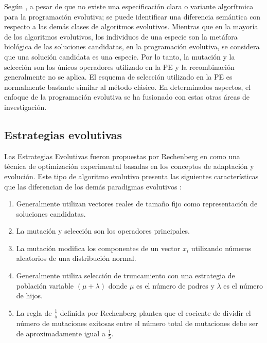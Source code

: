Según \cite{weise2009global}, a pesar de que no existe una especificación clara o variante algorítmica para la programación evolutiva; se puede identificar una diferencia semántica con respecto a las demás clases de algoritmos evolutivos. Mientras que en la mayoría de los algoritmos evolutivos, los individuos de una especie son la metáfora biológica de las soluciones candidatas, en la programación evolutiva, se considera que una solución candidata es una especie. Por lo tanto, la mutación y la selección son los únicos operadores utilizado en la PE y la recombinación generalmente no se aplica. El esquema de selección utilizado en la PE es normalmente bastante similar al método clásico. En determinados aspectos, el enfoque de la programación evolutiva se ha fusionado con estas otras áreas de investigación.


\subsection{Estrategias evolutivas}
Las Estrategias Evolutivas fueron propuestas por Rechenberg en \cite{rechenberg1973evolution} como una técnica de optimización experimental basadas en los conceptos de adaptación y evolución. Este tipo de algoritmo evolutivo presenta las siguientes características que las diferencian de los demás paradigmas evolutivos \cite{schwefel1995contemporary} \cite{weise2009global}:
\begin{enumerate}
\item Generalmente utilizan vectores reales de tamaño fijo como representación de soluciones candidatas.
\item La mutación y selección son los operadores principales.
\item La mutación modifica los componentes de un vector $x_i$ utilizando números aleatorios de una distribución normal.
\item Generalmente utiliza selección de truncamiento con una estrategia de población variable 
$(\mu+\lambda)$ donde $\mu$ es el número de padres y $\lambda$ es el número de hijos.
\item La regla de $\frac{1}{5}$ definida por Rechenberg plantea que el cociente de dividir el número de mutaciones exitosas entre el número total de mutaciones debe ser de aproximadamente igual a $\frac{1}{5}$. 
\end{enumerate}

